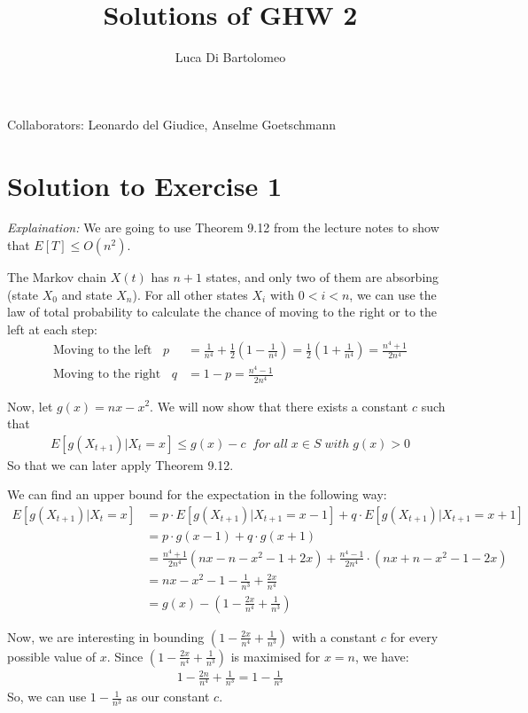 \documentclass[a4paper,german]{article}
\title{Solutions of GHW 2}
\author{Luca Di Bartolomeo}
\date{}
\begin{document}
\maketitle

{
	\centering
	Collaborators: Leonardo del Giudice, Anselme Goetschmann

}

\section*{Solution to Exercise 1}

\emph{Explaination:} We are going to use Theorem 9.12 from the lecture notes to show that $E[T] \leq O(n^2)$.


The Markov chain $X(t)$ has $n+1$ states, and only two of them are absorbing (state $X_0$ and state $X_n$).
For all other states $X_i$ with $0 < i < n$, we can use the law of total probability to calculate 
the chance of moving to the right or to the left at each step:
\begin{align*}
	\text{Moving to the left } \;\; p &= \frac{1}{n^4} + \frac{1}{2} \left(1 - \frac{1}{n^4} \right)  =
	\frac{1}{2} \left( 1 + \frac{1}{n^4} \right) = \frac{n^4 + 1}{2n^4}\\
	\text{Moving to the right } \;\; q &= 1 - p = \frac{n^4 - 1}{2n^4}
\end{align*}

Now, let $g(x) = nx - x^2$. We will now show that there exists a constant $c$ such that 
\begin{align*}
 E[g(X_{t+1}) | X_t = x] \leq g(x) - c \;\; for \; all \;x \in S \;with \;g(x) > 0
\end{align*}
So that we can later apply Theorem 9.12.

We can find an upper bound for the expectation in the following way:
\begin{align*}
	E[g(X_{t+1}) | X_t = x]  &= p \cdot E[g(X_{t+1}) | X_{t+1} = x - 1] + q \cdot E[g(X_{t+1}) | X_{t+1} = x+1] 
	\\	&= p \cdot g(x-1) + q \cdot g(x+1) 
	\\  &= \frac{n^4 + 1}{2n^4} (nx - n - x^2 - 1 + 2x) + \frac{n^4 - 1}{2n^4} \cdot (nx + n - x^2 - 1 - 2x)
	\\  &= nx - x^2 - 1 - \frac{1}{n^3} + \frac{2x}{n^4}
	\\  &= g(x)  - (1 - \frac{2x}{n^4} + \frac{1}{n^3})
\end{align*}

Now, we are interesting in bounding $(1 - \frac{2x}{n^4} + \frac{1}{n^3})$ with a constant $c$ for every possible value of $x$. Since $(1 - \frac{2x}{n^4} + \frac{1}{n^3})$ is maximised for $x = n$, we have:
\begin{align*}
	1 - \frac{2n}{n^4} + \frac{1}{n^3} = 1 - \frac{1}{n^3} 
\end{align*}
So, we can use $1 - \frac{1}{n^3}$ as our constant $c$.
\end{document}
